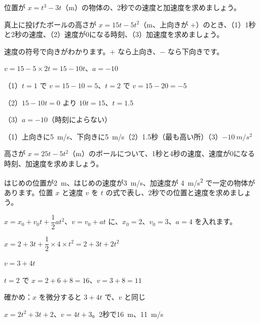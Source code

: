 \begin{jibun}
位置が $x=t^3-3t$（m）の物体の、2秒での速度と加速度を求めましょう。
\end{jibun}

\begin{reidai}[投げ上げ]
真上に投げたボールの高さが $x=15t-5t^2$（m、上向きが $+$）のとき、（1）1秒と2秒の速度、（2）速度が0になる時刻、（3）加速度を求めましょう。\par
\kangaekata 速度の符号で向きがわかります。$+$ なら上向き、$-$ なら下向きです。\par
\shiki $v=15-5\times2t=15-10t$、\enspace$a=-10$\par
\hspace*{2.6\zw}（1）$t=1$ で $v=15-10=5$、$t=2$ で $v=15-20=-5$\par
\hspace*{2.6\zw}（2）$15-10t=0$ より $10t=15$、$t=1.5$\par
\hspace*{2.6\zw}（3）$a=-10$（時刻によらない）\par
\kotae （1）上向きに\qty{5}{m/s}、下向きに\qty{5}{m/s}\quad（2）1.5秒（最も高い所）\quad（3）$\qty{-10}{m/s^2}$
\end{reidai}

\begin{jibun}
高さが $x=25t-5t^2$（m）のボールについて、1秒と4秒の速度、速度が0になる時刻、加速度を求めましょう。
\end{jibun}

\begin{reidai}[加速度が一定の運動の式をつくる]
はじめの位置が\qty{2}{m}、はじめの速度が\qty{3}{m/s}、加速度が \qty{4}{m/s^2} で一定の物体があります。位置 $x$ と速度 $v$ を $t$ の式で表し、2秒での位置と速度を求めましょう。\par
\kangaekata $x=x_0+v_0t+\dfrac{1}{2}at^2$、$v=v_0+at$ に、$x_0=2$、$v_0=3$、$a=4$ を入れます。\par
\shiki $x=2+3t+\dfrac{1}{2}\times4\times t^2=2+3t+2t^2$\par
\hspace*{2.6\zw}$v=3+4t$\par
\hspace*{2.6\zw}$t=2$ で $x=2+6+8=16$、$v=3+8=11$\par
\hspace*{2.6\zw}確かめ：$x$ を微分すると $3+4t$ で、$v$ と同じ\par
\kotae $x=2t^2+3t+2$、$v=4t+3$。2秒で\qty{16}{m}、\qty{11}{m/s}
\end{reidai}

